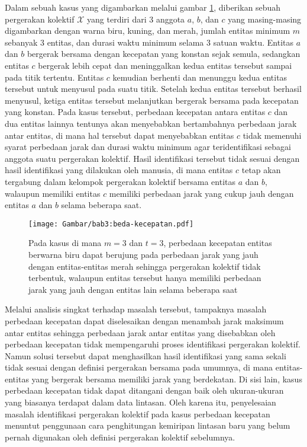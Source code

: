 \documentclass[a4paper,twoside]{article}
\begin{document}
Dalam sebuah kasus yang digambarkan melalui gambar \ref{bab3:masalah-kecepatan}, diberikan sebuah pergerakan kolektif $\mathcal{X}$ yang terdiri dari $3$ anggota $a$, $b$, dan $c$ yang masing-masing digambarkan dengan warna biru, kuning, dan merah, jumlah entitas minimum $m$ sebanyak $3$ entitas, dan durasi waktu minimum selama $3$ satuan waktu. Entitas $a$ dan $b$ bergerak bersama dengan kecepatan yang konstan sejak semula, sedangkan entitas $c$ bergerak lebih cepat dan meninggalkan kedua entitas tersebut sampai pada titik tertentu. Entitas $c$ kemudian berhenti dan menunggu kedua entitas tersebut untuk menyusul pada suatu titik. Setelah kedua entitas tersebut berhasil menyusul, ketiga entitas tersebut melanjutkan bergerak bersama pada kecepatan yang konstan. Pada kasus tersebut, perbedaan kecepatan antara entitas $c$ dan dua entitas lainnya tentunya akan menyebabkan bertambahnya perbedaan jarak antar entitas, di mana hal tersebut dapat menyebabkan entitas $c$ tidak memenuhi syarat perbedaan jarak dan durasi waktu minimum agar teridentifikasi sebagai anggota suatu pergerakan kolektif. Hasil identifikasi tersebut tidak sesuai dengan hasil identifikasi yang dilakukan oleh manusia, di mana entitas $c$ tetap akan tergabung dalam kelompok pergerakan kolektif bersama entitas $a$ dan $b$, walaupun memiliki entitas $c$ memiliki perbedaan jarak yang cukup jauh dengan entitas $a$ dan $b$ selama beberapa saat.

\begin{figure}[t]
    \centering
    \texttt{[image: Gambar/bab3:beda-kecepatan.pdf]}
    \caption{Pada kasus di mana $m = 3$ dan $t = 3$, perbedaan kecepatan entitas berwarna biru dapat berujung pada perbedaan jarak yang jauh dengan entitas-entitas merah sehingga pergerakan kolektif tidak terbentuk, walaupun entitas tersebut hanya memiliki perbedaan jarak yang jauh dengan entitas lain selama beberapa saat}
    \label{bab3:masalah-kecepatan}
\end{figure}
    
Melalui analisis singkat terhadap masalah tersebut, tampaknya masalah perbedaan kecepatan dapat diselesaikan dengan menambah jarak maksimum antar entitas sehingga perbedaan jarak antar entitas yang disebabkan oleh perbedaan kecepatan tidak mempengaruhi proses identifikasi pergerakan kolektif. Namun solusi tersebut dapat menghasilkan hasil identifikasi yang sama sekali tidak sesuai dengan definisi pergerakan bersama pada umumnya, di mana entitas-entitas yang bergerak bersama memiliki jarak yang berdekatan. Di sisi lain, kasus perbedaan kecepatan tidak dapat ditangani dengan baik oleh ukuran-ukuran yang biasanya terdapat dalam data lintasan. Oleh karena itu, penyelesaian masalah identifikasi pergerakan kolektif pada kasus perbedaan kecepatan menuntut penggunaan cara penghitungan kemiripan lintasan baru yang belum pernah digunakan oleh definisi pergerakan kolektif sebelumnya.
\end{document}
